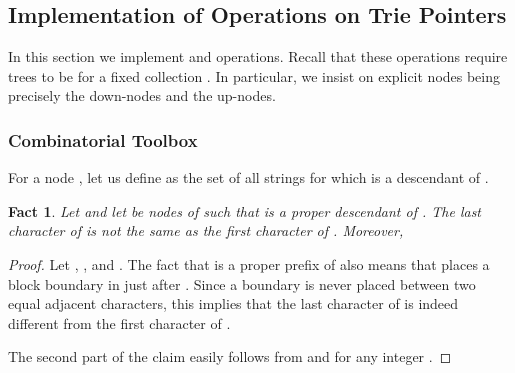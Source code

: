 \documentclass[a4paper]{article}
\newtheorem{fact}[theorem]{Fact}
\theoremstyle{remark}
\begin{document}
\subsection{Implementation of Operations on Trie Pointers}\label{sec:triepointers}
In this section we implement  and  operations.
Recall that these operations require trees  to be 
for a fixed collection .
In particular, we insist on explicit nodes being precisely the down-nodes and the up-nodes.

\subsubsection{Combinatorial Toolbox}


For a node , let us define  as the set of all strings 
for which  is a descendant of .

\begin{fact}\label{fct:link}
Let  and let  be nodes of  such that 
is a proper descendant of .
The last character of  is not the same as the first character of .
Moreover, 
\end{fact}
\begin{proof}
Let , , 
and . The fact that  is a proper prefix of 
also means that  places a block boundary in  just after .
Since a boundary is never placed between two equal adjacent characters, this implies that the last character of 
is indeed different from the first character of .

The second part of the claim easily follows from 
and  for any integer .
\end{proof}
\end{document}
